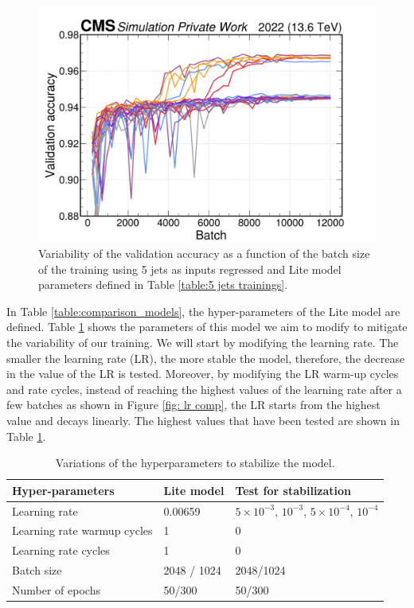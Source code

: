 \begin{figure}[hbt]
    \centering
    \includegraphics[scale=0.1]{Images/6.Improving/Variability Study/5 jets variability study.png}
    \caption{Variability of the validation accuracy as a function of the batch size of the training using 5 jets as inputs \pt regressed and Lite model parameters defined in Table \ref{table:5 jets trainings}.}
    \label{fig: 5j variability}
\end{figure}

In Table \ref{table:comparison_models}, the hyper-parameters of the Lite model are defined. Table \ref{table: variation hyperpaparm} shows the parameters of this model we aim to modify to mitigate the variability of our training. We will start by modifying the learning rate. The smaller the learning rate (LR), the more stable the model, therefore, the decrease in the value of the LR is tested. Moreover, by modifying the LR warm-up cycles and rate cycles, instead of reaching the highest values of the learning rate after a few batches as shown in Figure \ref{fig: lr comp}, the LR starts from the highest value and decays linearly. The highest values that have been tested are shown in Table \ref{table: variation hyperpaparm}.

\begin{table}[hbt]
\centering
\begin{tabular}{|p{5cm}|p{4cm}|p{5cm}|}
 \hline
 Hyper-parameters  & Lite model & Test for stabilization \\
 \hline
 Learning rate & 0.00659 & $5\times 10^{-3}$, $10^{-3}$, $5\times 10^{-4}$, $10^{-4}$ \\
 \hline
 Learning rate warmup cycles & 1 & 0\\
 \hline
  Learning rate cycles & 1 & 0\\
 \hline
 Batch size & 2048 / 1024 & 2048/1024 \\
 \hline
 Number of epochs & 50/300 & 50/300 \\
 \hline
\end{tabular}
\caption{Variations of the hyperparameters to stabilize the model.}
\label{table: variation hyperpaparm}
\end{table}

